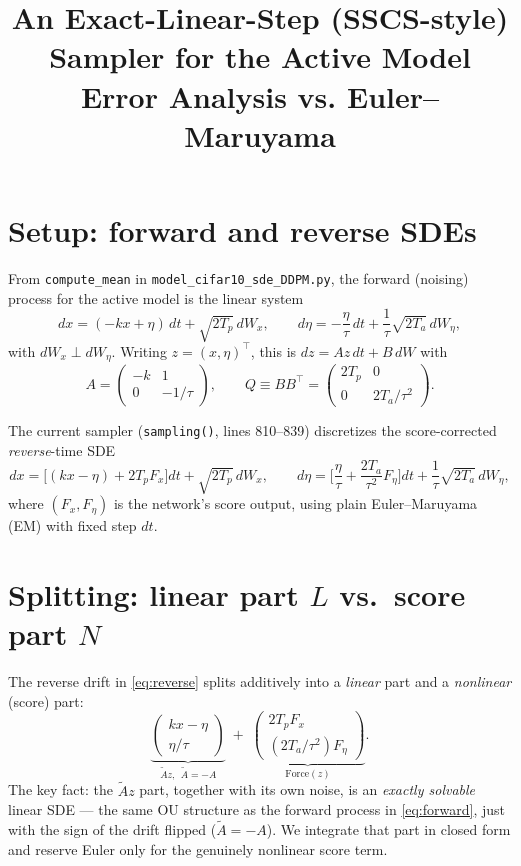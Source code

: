 \documentclass[11pt]{article}
\title{An Exact-Linear-Step (SSCS-style) Sampler for the Active Model\\
\large Error Analysis vs. Euler--Maruyama}
\author{}
\date{}
\begin{document}
\maketitle

\section{Setup: forward and reverse SDEs}

From \texttt{compute\_mean} in \texttt{model\_cifar10\_sde\_DDPM.py}, the forward
(noising) process for the active model is the linear system
\begin{equation}
dx = (-kx + \eta)\,dt + \sqrt{2T_p}\,dW_x,
\qquad
d\eta = -\frac{\eta}{\tau}\,dt + \frac{1}{\tau}\sqrt{2T_a}\,dW_\eta,
\label{eq:forward}
\end{equation}
with $dW_x \perp dW_\eta$. Writing $z = (x,\eta)^\top$, this is $dz = Az\,dt + B\,dW$ with
\begin{equation}
A = \begin{pmatrix} -k & 1 \\ 0 & -1/\tau \end{pmatrix},
\qquad
Q \equiv BB^\top = \begin{pmatrix} 2T_p & 0 \\ 0 & 2T_a/\tau^2 \end{pmatrix}.
\end{equation}

The current sampler (\texttt{sampling()}, lines 810--839) discretizes the
score-corrected \emph{reverse}-time SDE
\begin{equation}
dx = \Big[(kx - \eta) + 2T_p F_x\Big]dt + \sqrt{2T_p}\,dW_x,
\qquad
d\eta = \Big[\frac{\eta}{\tau} + \frac{2T_a}{\tau^2}F_\eta\Big]dt + \frac{1}{\tau}\sqrt{2T_a}\,dW_\eta,
\label{eq:reverse}
\end{equation}
where $(F_x,F_\eta)$ is the network's score output, using plain
Euler--Maruyama (EM) with fixed step $dt$.

\section{Splitting: linear part $L$ vs.\ score part $N$}

The reverse drift in \eqref{eq:reverse} splits additively into a \emph{linear}
part and a \emph{nonlinear} (score) part:
\begin{equation}
\underbrace{\begin{pmatrix} kx-\eta \\ \eta/\tau \end{pmatrix}}_{\tilde A z,\ \ \tilde A = -A}
\;+\;
\underbrace{\begin{pmatrix} 2T_p F_x \\ (2T_a/\tau^2) F_\eta \end{pmatrix}}_{\text{Force}(z)}.
\end{equation}
The key fact: the $\tilde A z$ part, together with its own noise, is an
\emph{exactly solvable} linear SDE — the same OU structure as the forward
process in \eqref{eq:forward}, just with the sign of the drift flipped
($\tilde A = -A$). We integrate that part in closed form and reserve
Euler only for the genuinely nonlinear score term.
\end{document}
